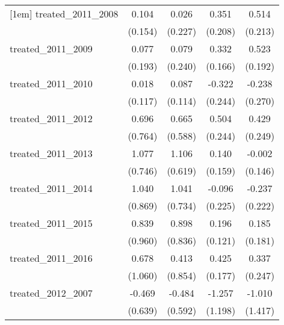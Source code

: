 {\begin{tabular}{l*{4}{c}}
[1em]
treated\_2011\_2008&       0.104         &       0.026         &       0.351         &       0.514\sym{*}  \\
            &     (0.154)         &     (0.227)         &     (0.208)         &     (0.213)         \\
[1em]
treated\_2011\_2009&       0.077         &       0.079         &       0.332\sym{*}  &       0.523\sym{**} \\
            &     (0.193)         &     (0.240)         &     (0.166)         &     (0.192)         \\
[1em]
treated\_2011\_2010&       0.018         &       0.087         &      -0.322         &      -0.238         \\
            &     (0.117)         &     (0.114)         &     (0.244)         &     (0.270)         \\
[1em]
treated\_2011\_2012&       0.696         &       0.665         &       0.504\sym{*}  &       0.429         \\
            &     (0.764)         &     (0.588)         &     (0.244)         &     (0.249)         \\
[1em]
treated\_2011\_2013&       1.077         &       1.106         &       0.140         &      -0.002         \\
            &     (0.746)         &     (0.619)         &     (0.159)         &     (0.146)         \\
[1em]
treated\_2011\_2014&       1.040         &       1.041         &      -0.096         &      -0.237         \\
            &     (0.869)         &     (0.734)         &     (0.225)         &     (0.222)         \\
[1em]
treated\_2011\_2015&       0.839         &       0.898         &       0.196         &       0.185         \\
            &     (0.960)         &     (0.836)         &     (0.121)         &     (0.181)         \\
[1em]
treated\_2011\_2016&       0.678         &       0.413         &       0.425\sym{*}  &       0.337         \\
            &     (1.060)         &     (0.854)         &     (0.177)         &     (0.247)         \\
[1em]
treated\_2012\_2007&      -0.469         &      -0.484         &      -1.257         &      -1.010         \\
            &     (0.639)         &     (0.592)         &     (1.198)         &     (1.417)         \\

\end{tabular}}
